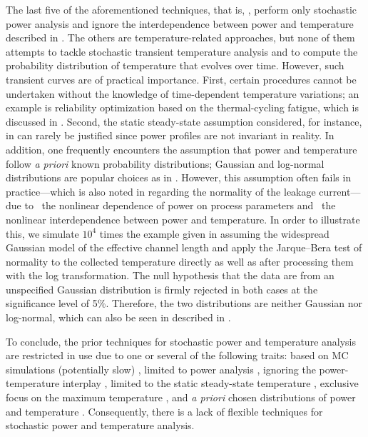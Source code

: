 The last five of the aforementioned techniques, that is, \cite{bhardwaj2006,
vrudhula2006, ghanta2006, bhardwaj2008, shen2009}, perform only stochastic power
analysis and ignore the interdependence between power and temperature described
in . The others are temperature-related approaches, but none
of them attempts to tackle stochastic transient temperature analysis and to
compute the probability distribution of temperature that evolves over time.
However, such transient curves are of practical importance. First, certain
procedures cannot be undertaken without the knowledge of time-dependent
temperature variations; an example is reliability optimization based on the
thermal-cycling fatigue, which is discussed in
. Second, the static steady-state assumption
considered, for instance, in \cite{huang2009a, juan2011, juan2012, lee2013} can
rarely be justified since power profiles are not invariant in reality. In
addition, one frequently encounters the assumption that power and temperature
follow \emph{a priori} known probability distributions; Gaussian and log-normal
distributions are popular choices as in \cite{bhardwaj2006, srivastava2010,
juan2012}. However, this assumption often fails in practice---which is also
noted in \cite{juan2012} regarding the normality of the leakage current---due to
\one~the nonlinear dependence of power on process parameters and \two~the
nonlinear interdependence between power and temperature. In order to illustrate
this, we simulate $10^4$ times the example given in 
assuming the widespread Gaussian model of the effective channel length and apply
the Jarque--Bera test of normality to the collected temperature directly as well
as after processing them with the log transformation. The null hypothesis that
the data are from an unspecified Gaussian distribution is firmly rejected in
both cases at the significance level of 5\%. Therefore, the two distributions
are neither Gaussian nor log-normal, which can also be seen in
 described in .

To conclude, the prior techniques for stochastic power and temperature analysis
are restricted in use due to one or several of the following traits: based on
\ac{MC} simulations (potentially slow) \cite{chandra2010}, limited to power
analysis \cite{bhardwaj2006, ghanta2006, vrudhula2006, bhardwaj2008, shen2009,
chandra2010}, ignoring the power-temperature interplay \cite{bhardwaj2006,
ghanta2006, vrudhula2006, bhardwaj2008, huang2009a, shen2009}, limited to the
static steady-state temperature \cite{huang2009a, juan2011, juan2012, lee2013},
exclusive focus on the maximum temperature \cite{juan2011}, and \emph{a priori}
chosen distributions of power and temperature \cite{bhardwaj2006,
srivastava2010, juan2012}. Consequently, there is a lack of flexible techniques
for stochastic power and temperature analysis.


